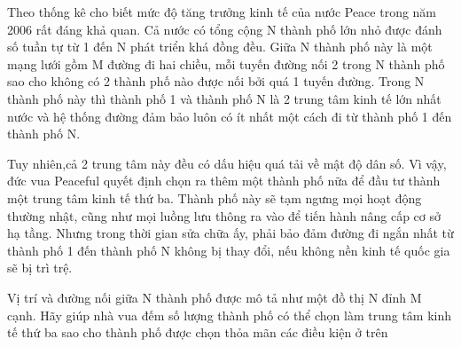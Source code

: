 Theo thống kê cho biết mức độ tăng trưởng kinh tế của nước Peace trong năm 2006 rất đáng khả quan. Cả nước có tổng cộng N thành phố lớn nhỏ  được đánh số tuần tự từ 1 đến N phát triển khá đồng đều. Giữa N thành phố này là một mạng lưới gồm M đường đi hai chiều, mỗi tuyến đường nối 2 trong N thành phố sao cho không có 2 thành phố nào được nối bởi quá 1 tuyến đường. Trong N thành phố này thì thành phố 1 và thành phố N là 2 trung tâm kinh tế lớn nhất nước và hệ thống đường đảm bảo luôn có ít nhất một cách đi từ thành phố 1 đến thành phố N.  



   Tuy nhiên,cả 2 trung tâm này đều có dấu hiệu quá tải về mật độ dân số. Vì vậy, đức vua Peaceful quyết định chọn ra thêm một thành phố nữa để đầu tư thành một trung tâm kinh tế thứ ba. Thành phố này sẽ tạm ngưng mọi hoạt động thường nhật, cũng như mọi luồng lưu thông ra vào để tiến hành nâng cấp cơ sở hạ tầng. Nhưng trong thời gian sửa chữa ấy, phải bảo đảm đường đi ngắn nhất từ thành phố 1 đến thành phố N không bị thay đổi, nếu không nền kinh tế quốc gia sẽ bị trì trệ.  



   Vị trí và đường nối giữa N thành phố được mô tả như một đồ thị N đỉnh M cạnh. Hãy giúp nhà vua đếm số lượng thành phố có thể chọn làm trung tâm kinh tế thứ ba sao cho thành phố được chọn thỏa mãn các điều kiện ở trên